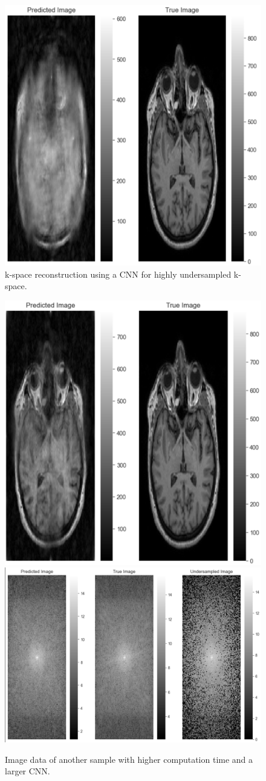 \documentclass[14pt]{extreport}
\begin{document}
        \begin{figure}[h]
            \centering
            \includegraphics[width=0.5\linewidth]{Image_2.png}
            \caption{k-space reconstruction using a CNN for highly undersampled k-space.}
            \label{img:image-1}
        \end{figure}

        \begin{figure}[h]
            \centering
            \includegraphics[width=0.39\linewidth]{CNN_1.png}
            \includegraphics[width = 0.58\linewidth]{CNN_1_kspace.png}
            \caption{Image data of another sample with higher computation time and a larger CNN.}
            \label{img:CNN_1}
        \end{figure}
\end{document}
